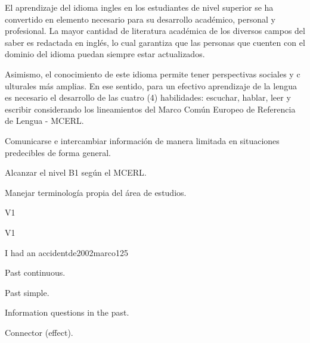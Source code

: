 \begin{syllabus}


\begin{justification}
El aprendizaje del idioma ingles en los estudiantes de nivel superior se ha 
convertido en elemento necesario para su desarrollo académico, personal y 
profesional. La mayor cantidad de literatura académica de los diversos campos 
del saber es redactada en inglés, lo cual garantiza que las personas que cuenten 
con el dominio del idioma puedan siempre estar actualizados. 

Asimismo, el conocimiento de este idioma permite tener perspectivas sociales y c
ulturales más amplias. En ese sentido, para un efectivo aprendizaje de la 
lengua es necesario el desarrollo de las cuatro (4) habilidades: 
escuchar, hablar, leer y escribir considerando los lineamientos del 
Marco Común Europeo de Referencia de Lengua - MCERL.
\end{justification}

\begin{goals}
\item Comunicarse e intercambiar información de manera limitada en situaciones predecibles de forma general.
\item Alcanzar el nivel B1 según el MCERL.
\item Manejar terminología propia del área de estudios.
\end{goals}

\begin{outcomes}{V1}
\item {}
\end{outcomes}

\begin{competences}{V1}
    \item {}
\end{competences}

\begin{unit}{I had an accident}{}{de2002marco}{12}{5}
   \begin{topics}
      \item Past continuous.
      \item Past simple.
      \item Information questions in the past.
      \item Connector (effect).
   \end{topics}


\end{unit}
\end{syllabus}
